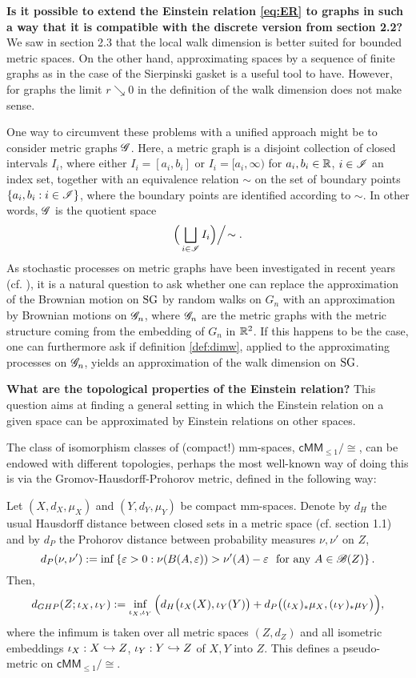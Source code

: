 \textbf{Is it possible to extend the Einstein relation \eqref{eq:ER} to graphs in such a way that it is compatible with the discrete version from section 2.2?}
We saw in section 2.3 that the local walk dimension is better suited for bounded metric spaces. On the other hand, approximating spaces by a sequence of finite graphs as in the case of the Sierpinski gasket is a useful tool to have. However, for graphs the limit $r\searrow0$ in the definition of the walk dimension does not make sense. 

One way to circumvent these problems with a unified approach might be to consider metric graphs $\mathscr{G}$. Here, a metric graph is a disjoint collection of closed intervals $I_i$, where either $I_i=[a_i,b_i]$ or $I_i=[a_i,\infty)$ for $a_i,b_i\in\mathbb{R}$, $i\in\mathscr{I}$ an index set, together with an equivalence relation $\sim$ on the set of boundary points $\{a_i,b_i:i\in\mathscr{I}\}$, where the boundary points are identified according to $\sim$. In other words, $\mathscr{G}$ is the quotient space
\[
  \Big(\bigsqcup_{i\in\mathscr{I}} I_i\Big)\Big/\!\sim.
\]
As stochastic processes on metric graphs have been investigated in recent years (cf. \cite{werner2016brownian}), it is a natural question to ask whether one can replace the approximation of the Brownian motion on $\operatorname{SG}$ by random walks on $G_n$ with an approximation by Brownian motions on $\mathscr{G}_n$, where $\mathscr{G}_n$ are the metric graphs with the metric structure coming from the embedding of $G_n$ in $\mathbb{R}^2$. If this happens to be the case, one can furthermore ask if definition \ref{def:dimw}, applied to the approximating processes on $\mathscr{G}_n$, yields an approximation of the walk dimension on $\operatorname{SG}$. 

\textbf{What are the topological properties of the Einstein relation?} This question aims at finding a general setting in which the Einstein relation on a given space can be approximated by Einstein relations on other spaces.

The class of isomorphism classes of (compact!) mm-spaces, 
$\mathsf{cMM}_{\leq1}\big/\!\cong$, can be endowed with different topologies, perhaps the most well-known way of doing this is via the Gromov-Hausdorff-Prohorov metric, defined in the following way: 
  
Let $(X,d_X,\mu_X)$ and $(Y,d_Y,\mu_Y)$ be compact mm-spaces. Denote by $d_H$ the usual Hausdorff distance between closed sets in a metric space (cf. section 1.1) and by $d_P$ the Prohorov distance between probability measures $\nu,\nu'$ on $Z$,
\[
  d_P(\nu,\nu'):=\inf\left\{\varepsilon>0: \nu(B(A,\varepsilon))>\nu'(A)-\varepsilon\
    \text{ for any } A\in\mathscr{B}(Z)\right\}.
\]  
Then,
\[
  d_{GHP}(Z;\iota_X,\iota_Y):=\inf_{\iota_X,\iota_Y}
     \Big(d_H\big(\iota_X(X),\iota_Y(Y)\big)
     +d_P\big((\iota_X)_*\mu_X,(\iota_Y)_*\mu_Y\big)\Big),
\]
where the infimum is taken over all metric spaces $(Z,d_Z)$ and all isometric embeddings \linebreak $\iota_X:X\hookrightarrow Z$, 
$\iota_Y:Y\hookrightarrow Z$ of $X,Y$ into $Z$. This defines a pseudo-metric on $\mathsf{cMM}_{\leq1}\big/\!\cong$. 
  
